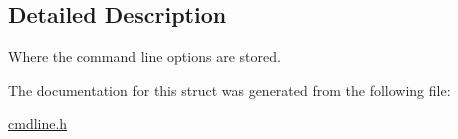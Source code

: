 \subsection{Detailed Description}
Where the command line options are stored. 

The documentation for this struct was generated from the following file\+:\begin{DoxyCompactItemize}
\item 
\hyperlink{cmdline_8h}{cmdline.\+h}\end{DoxyCompactItemize}
